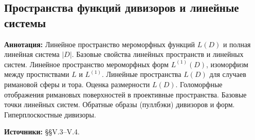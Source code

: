 \documentclass[a4paper, 12pt]{article}
\begin{document}
\subsection{Пространства функций дивизоров и линейные системы}

{\bf Аннотация:} Линейное пространство мероморфных функций $L(D)$ и полная линейная система $|D|$. Базовые свойства линейных пространств и линейных систем. Линейное пространство мероморфных форм $L^{(1)}(D)$, изоморфизм между простнствами $L$ и $L^{(1)}$. Линейные пространства $L(D)$ для случаев римановой сферы и тора. Оценка размерности $L(D)$. Голоморфные отображения римановых поверхностей в проективные пространства. Базовые точки линейных систем. Обратные образы (пуллбэки) дивизоров и форм. Гиперплоскостные дивизоры.

{\bf Источники:} \cite{Mir} \S\S V.3--V.4.
\end{document}
